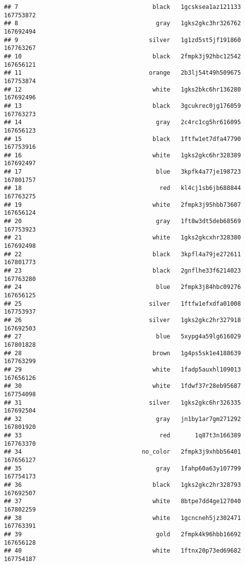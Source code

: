 \documentclass[
]{article}
\begin{document}
\begin{verbatim}
## 7                                      black   1gcsksea1az121133 167753872
## 8                                       gray   1gks2gkc3hr326762 167692494
## 9                                     silver   1g1zd5st5jf191860 167763267
## 10                                     black   2fmpk3j92hbc12542 167656121
## 11                                    orange   2b3lj54t49h509675 167753874
## 12                                     white   1gks2bkc6hr136280 167692496
## 13                                     black   3gcukrec0jg176059 167763273
## 14                                      gray   2c4rc1cg5hr616095 167656123
## 15                                     black   1ftfw1et7dfa47790 167753916
## 16                                     white   1gks2gkc6hr328389 167692497
## 17                                      blue   3kpfk4a77je198723 167801757
## 18                                       red   kl4cj1sb6jb688844 167763275
## 19                                     white   2fmpk3j95hbb73607 167656124
## 20                                      gray   1ft8w3dt5deb68569 167753923
## 21                                     white   1gks2gkcxhr328380 167692498
## 22                                     black   3kpfl4a79je272611 167801773
## 23                                     black   2gnflhe33f6214023 167763280
## 24                                      blue   2fmpk3j84hbc09276 167656125
## 25                                    silver   1ftfw1efxdfa01008 167753937
## 26                                    silver   1gks2gkc2hr327918 167692503
## 27                                      blue   5xypg4a59lg616029 167801828
## 28                                     brown   1g4ps5sk1e4188639 167763299
## 29                                     white   1fadp5auxhl109013 167656126
## 30                                     white   1fdwf37r28eb95687 167754098
## 31                                    silver   1gks2gkc6hr326335 167692504
## 32                                      gray   jn1by1ar7gm271292 167801920
## 33                                       red       1q87t3n166389 167763370
## 34                                  no_color   2fmpk3j9xhbb56401 167656127
## 35                                      gray   1fahp60a63y107799 167754173
## 36                                     black   1gks2gkc2hr328793 167692507
## 37                                     white   8btpe7dd4ge127040 167802259
## 38                                     white   1gcncneh5jz302471 167763391
## 39                                      gold   2fmpk4k96hbb16692 167656128
## 40                                     white   1ftnx20p73ed69682 167754187

\end{verbatim}
\end{document}
